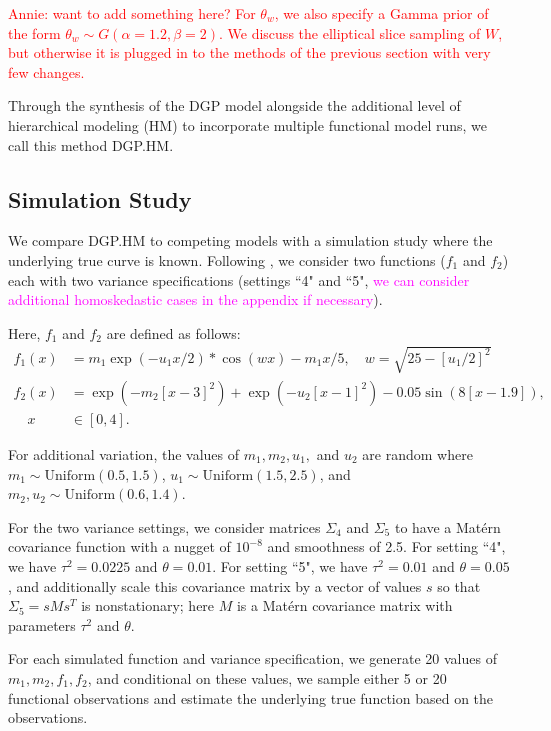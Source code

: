 \documentclass[11pt]{article}
\begin{document}
\textcolor{red}{Annie: want to add something here? For $\theta_w$, we also specify 
a Gamma prior of the form $\theta_w \sim G(\alpha=1.2, \beta=2)$. We discuss the 
elliptical slice sampling of $W$, but otherwise it is plugged in to the methods 
of the previous section with very few changes.}

Through the synthesis of the DGP model alongside the additional level of hierarchical 
modeling (HM) to incorporate multiple functional model runs, we call this method DGP.HM.

\subsection{Simulation Study}
\label{subsec:sim}

We compare DGP.HM to competing models with a simulation study where the underlying 
true curve is known. Following \cite{moran2024dpc}, we consider two functions 
($f_1$ and $f_2$) each with two variance specifications (settings ``4" and ``5", 
\textcolor{magenta}{we can consider additional homoskedastic cases in the appendix if necessary}). 

Here, $f_1$ and $f_2$ are defined as follows:
\begin{align}
  f_1(x) &= m_1 \exp(-u_1x/2) * \cos(wx) - m_1x/5, \quad w=\sqrt{25-[u_1/2]^2} \\
  f_2(x) &= \exp(-m_2[x-3]^2)+\exp(-u_2[x-1]^2)-0.05\sin(8[x-1.9]), \\ 
  \quad x &\in [0,4].
\end{align}

For additional variation, the values of $m_1, m_2, u_1,$ and $u_2$ are random where 
$m_1 \sim \text{Uniform}(0.5,1.5)$, $u_1 \sim \text{Uniform}(1.5,2.5)$, and $m_2,u_2 
\sim \text{Uniform}(0.6,1.4)$. 
      
For the two variance settings, we consider matrices $\Sigma_4$ and $\Sigma_5$ to 
have a Mat\'ern covariance function with a nugget of $10^{-8}$ and smoothness of 2.5. 
For setting ``4", we have $\tau^2=0.0225$ and $\theta=0.01$. For setting ``5", we have 
$\tau^2=0.01$ and $\theta=0.05$, and additionally scale this covariance matrix by 
a vector of values $s$ so that $\Sigma_5 = s M s^T$ is nonstationary; here $M$ is 
a Mat\'ern covariance matrix with parameters $\tau^2$ and $\theta$.

For each simulated function and variance specification, we generate 20 values of 
$m_1, m_2, f_1, f_2$, and conditional on these values, we sample either 5 or 20 
functional observations and estimate the underlying true function based on the observations.
\end{document}
